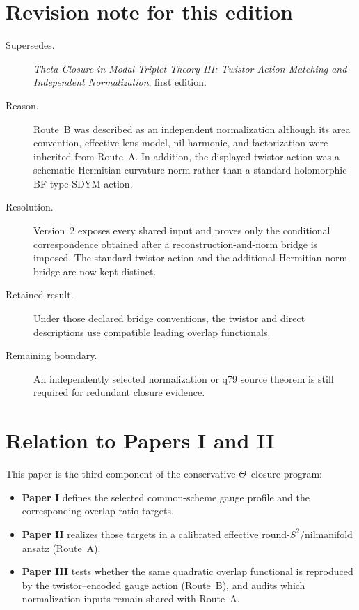 \documentclass[11pt]{article}
\begin{document}
\section*{Revision note for this edition}
\begin{description}
\item[Supersedes.] \emph{Theta Closure in Modal Triplet Theory III: Twistor
Action Matching and Independent Normalization}, first edition.
\item[Reason.] Route~B was described as an independent normalization although
its area convention, effective lens model, nil harmonic, and factorization
were inherited from Route~A. In addition, the displayed twistor action was a
schematic Hermitian curvature norm rather than a standard holomorphic
BF-type SDYM action.
\item[Resolution.] Version~2 exposes every shared input and proves only the
conditional correspondence obtained after a reconstruction-and-norm bridge is
imposed. The standard twistor action and the additional Hermitian norm bridge
are now kept distinct.
\item[Retained result.] Under those declared bridge conventions, the twistor
and direct descriptions use compatible leading overlap functionals.
\item[Remaining boundary.] An independently selected normalization or q79
source theorem is still required for redundant closure evidence.
\end{description}


\section{Relation to Papers I and II}

This paper is the third component of the conservative $\Theta$--closure program:
\begin{itemize}
\item \textbf{Paper I} defines the selected common-scheme gauge profile and
the corresponding overlap-ratio targets.
\item \textbf{Paper II} realizes those targets in a calibrated effective
round-$S^2$/nilmanifold ansatz (Route~A).
\item \textbf{Paper III} tests whether the same quadratic overlap functional
is reproduced by the twistor--encoded gauge action (Route~B), and audits which
normalization inputs remain shared with Route~A.
\end{itemize}
\end{document}
